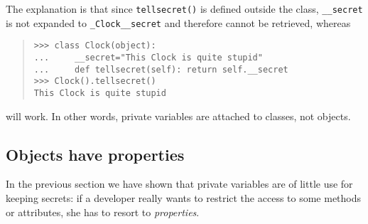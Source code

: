 \documentclass[10pt,english]{article}
\begin{document}
The explanation is that since \texttt{tellsecret()} is defined outside the class,
\texttt{{\_}{\_}secret} is not expanded to \texttt{{\_}Clock{\_}{\_}secret} and therefore cannot be
retrieved, whereas
\begin{quote}
\begin{verbatim}>>> class Clock(object): 
...     __secret="This Clock is quite stupid"
...     def tellsecret(self): return self.__secret
>>> Clock().tellsecret()
This Clock is quite stupid\end{verbatim}
\end{quote}

will work. In other words, private variables are attached to classes,
not objects.



\hypertarget{objects-have-properties}{}
\subsection*{Objects have properties}

In the previous section we have shown that private variables are of
little use for keeping secrets: if a developer really wants to restrict 
the access to some methods or attributes, she has to resort to
\emph{properties}.
\end{document}
